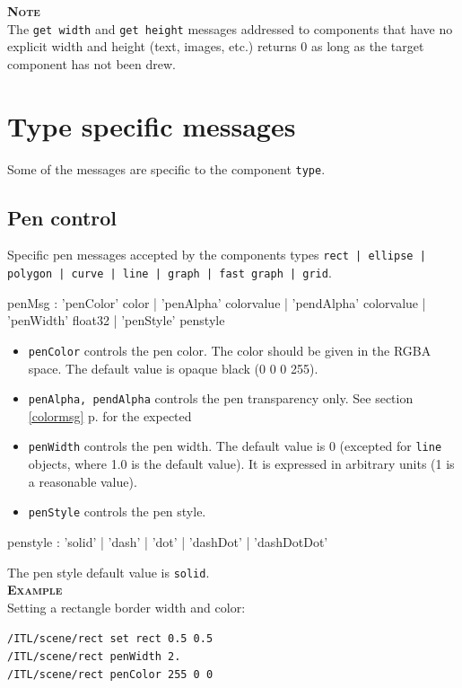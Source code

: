\documentclass[a4paper,twoside]{report}
\newcommand{\toplevel}[1]	{\chapter{#1}}
\newcommand{\sublevel}[1]	{\section{#1}}
\newcommand{\fullref}[1]	{\ref{#1} p.\pageref{#1}}
\newcommand{\OSC}[1]		{\texttt{#1}}
\newcommand{\example}		{\textbf{\hspace{-1.5cm}\textbf{\textsc{Example }}}}
\newcommand{\note}	[1]		{\vspace{2mm}\textbf{\hspace{-1.03cm}\textbf{\textsc{Note #1}}}}
\newcommand{\sample}	[1]			{\vspace{-2mm}\begin{center}\colorbox{mygrey}{
								\begin{minipage}[t]{0.9\columnwidth} 
								{\small \texttt{#1}}
								\end{minipage}}\end{center}}
\begin{document}
\note{} \\
The \OSC{get width} and \OSC{get height} messages addressed to components that have no explicit width and height (text, images, etc.) returns 0 as long as the target component has not been drew.



\toplevel{Type specific messages}
\label{specificMsg}
Some of the messages are specific to the component \OSC{type}.

\sublevel{Pen control}

Specific pen messages accepted by the components types \OSC{rect | ellipse | polygon | curve | line | graph | fast graph | grid}.
\begin{rail}
penMsg : 	  'penColor' color 
			| 'penAlpha' colorvalue
			| 'pendAlpha' colorvalue
			| 'penWidth' float32
			| 'penStyle' penstyle
\end{rail}

\begin{itemize}
\item \OSC{penColor} controls the pen color. The color should be given in the RGBA space. The default value is opaque black (0 0 0 255).
\item \OSC{penAlpha, pendAlpha} controls the pen transparency only. See section \fullref{colormsg} for the expected \item \OSC{penWidth} controls the pen width. The default value is 0 (excepted for \OSC{line} objects, where 1.0 is the default value). It is expressed in arbitrary units (1 is a reasonable value).
\item \OSC{penStyle} controls the pen style.
 \end{itemize}


\begin{rail}
penstyle : 'solid' | 'dash' | 'dot' | 'dashDot' | 'dashDotDot'
\end{rail}

The pen style default value is \OSC{solid}.\\

\example \\
Setting a rectangle border width and color:
\sample{/ITL/scene/rect set rect 0.5 0.5 \\
/ITL/scene/rect penWidth 2. \\
/ITL/scene/rect penColor 255 0 0  
}
\end{document}
